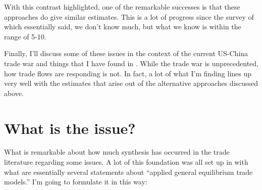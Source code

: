 \documentclass[pdftex,12pt]{article}
\begin{document}
With this contrast highlighted, one of the remarkable successes is that these approaches do give similar estimates. This is a lot of progress since the survey of \citet{anderson2004trade} which essentially said, we don't know much, but what we know is within the range of 5-10.

Finally, I'll discuss some of these issues in the context of the current US-China trade war and things that I have found in \citet{waugh_consumption}. While the trade war is unprecedented, how trade flows are responding is not. In fact, a lot of what I'm finding lines up very well with the estimates that arise out of the alternative approaches discussed above.

\section{What is the issue?}
What is remarkable about how much synthesis has occurred in the trade literature regarding some issues. A lot of this foundation was all set up in \citet{arkolakis2012new} with what are essentially several statements about ``applied general equilibrium trade models.'' I'm going to formulate it in this way:
\end{document}
